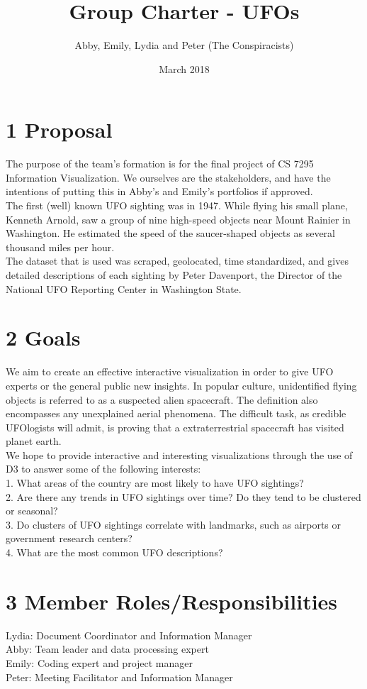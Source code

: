 \documentclass{neu_handout}
\title{Group Charter - UFOs}
\author{Abby, Emily, Lydia and Peter (The Conspiracists)}
\date{March 2018}
\begin{document}
\section*{1 Proposal}
The purpose of the team’s formation is for the final project of CS 7295 Information Visualization. We ourselves are the stakeholders, and have the intentions of putting this in Abby’s and Emily’s portfolios if approved.\\

The first (well) known UFO sighting was in 1947. While flying his small plane, Kenneth Arnold, saw a group of nine high-speed objects near Mount Rainier in Washington. He estimated the speed of the saucer-shaped objects as several thousand miles per hour.\\

The dataset that is used was scraped, geolocated, time standardized, and gives detailed descriptions of each sighting by Peter Davenport, the Director of the National UFO Reporting Center in Washington State. 

\section*{2 Goals}
We aim to create an effective interactive visualization in order to give UFO experts or the general public new insights. In popular culture, unidentified flying objects is referred to as a suspected alien spacecraft. The definition also encompasses any unexplained aerial phenomena. The difficult task, as credible UFOlogists will admit, is proving that a extraterrestrial spacecraft has visited planet earth.\\

We hope to provide interactive and interesting visualizations through the use of D3 to answer some of the following interests:\\

1. What areas of the country are most likely to have UFO sightings? \\
2. Are there any trends in UFO sightings over time? Do they tend to be clustered or seasonal? \\
3. Do clusters of UFO sightings correlate with landmarks, such as airports or government research centers?\\
4. What are the most common UFO descriptions?

\section*{3 Member Roles/Responsibilities}
Lydia: Document Coordinator and Information Manager \\
Abby: Team leader and data processing expert \\
Emily: Coding expert and project manager \\
Peter: Meeting Facilitator and Information Manager\\
\end{document}
